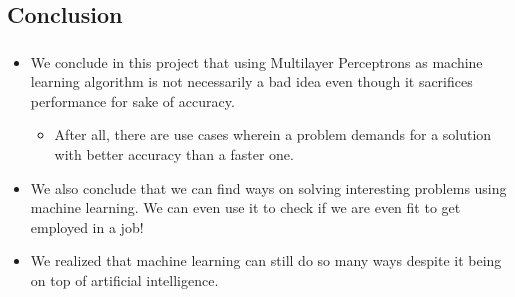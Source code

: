\subsection{Conclusion}
\begin{frame}
\frametitle{\subsecname}
	\begin{itemize}
		\item We conclude in this project that using Multilayer Perceptrons as machine learning algorithm is not necessarily a bad idea even though it sacrifices performance for sake of accuracy.
		\begin{itemize}
			\item After all, there are use cases wherein a problem demands for a solution with better accuracy than a faster one.
		\end{itemize}
		\item We also conclude that we can find ways on solving interesting problems using machine learning. We can even use it to check if we are even fit to get employed in a job! 
		\item We realized that machine learning can still do so many ways despite it being on top of artificial intelligence.
	\end{itemize}
\end{frame}
